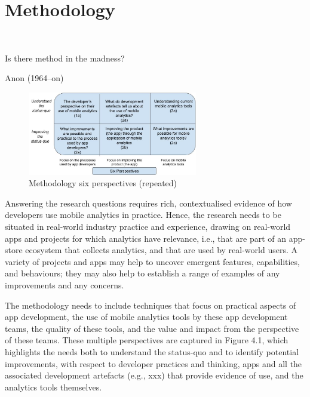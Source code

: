 \chapter{Methodology}~\label{chapter-methodology}
\epigraph{Is there method in the madness?}{Anon (1964--on)}


\begin{figure}
  \vspace{-0.75\intextsep}
  \begin{center}
    \includegraphics[width=0.66\textwidth]{images/my/six-perspectives-2x3-matrix-25-oct-2021abc.jpeg}
  \end{center}
    \caption{Methodology six perspectives (repeated)}
    \label{fig:six-perspectives-in-the-methodology}
\end{figure}

Answering the research questions requires rich, contextualised evidence of how developers use mobile analytics in practice.  Hence, the research needs to be situated in real-world industry practice and experience, drawing on real-world apps and projects for which analytics have relevance, i.e., that are part of an app-store ecosystem that collects analytics, and that are used by real-world users. A variety of projects and apps may help to uncover emergent features, capabilities, and behaviours; they may also help to establish a range of examples of any improvements and any concerns.  

The methodology needs to include techniques that focus on practical aspects of app development, the use of mobile analytics tools by these app development teams, the quality of these tools, and the value and impact from the perspective of these teams.  These multiple perspectives are captured in Figure 4.1, which highlights the needs both to understand the status-quo and to identify potential improvements, with respect to developer practices and thinking, apps and all the associated development artefacts (e.g., xxx) that provide evidence of use, and the analytics tools themselves.

